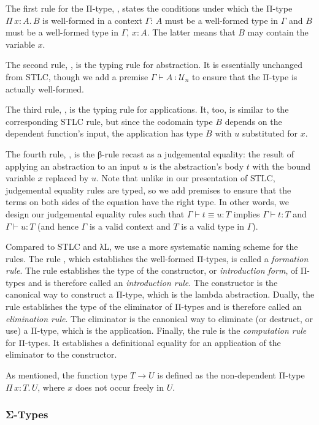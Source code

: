 \documentclass{scrartcl}
\theoremstyle{definition}
\newcommand{\PiT}[2]{Π\,#1.\, #2}
\newcommand{\Univ}{\mathcal{U}}
\newcommand{\lbl}[1]{\RightTirNameStyle{#1}}
\begin{document}
The first rule for the Π-type, \lbl{Π-Form}, states the conditions under which the Π-type $\PiT{x : A}{B}$ is well-formed in a context $Γ$: $A$ must be a well-formed type in $Γ$ and $B$ must be a well-formed type in $Γ,\, x : A$.
The latter means that $B$ may contain the variable $x$.

The second rule, \lbl{Π-Intro}, is the typing rule for abstraction.
It is essentially unchanged from STLC, though we add a premise $Γ ⊢ A ∶ \Univ_{n}$ to ensure that the Π-type is actually well-formed.

The third rule, \lbl{Π-Elim}, is the typing rule for applications.
It, too, is similar to the corresponding STLC rule, but since the codomain type $B$ depends on the dependent function's input, the application has type $B$ with $u$ substituted for $x$.

The fourth rule, \lbl{Π-Comp}, is the β-rule recast as a judgemental equality: the result of applying an abstraction to an input $u$ is the abstraction's body $t$ with the bound variable $x$ replaced by $u$.
Note that unlike in our presentation of STLC, judgemental equality rules are typed, so we add premises to ensure that the terms on both sides of the equation have the right type.
In other words, we design our judgemental equality rules such that $Γ ⊢ t ≡ u : T$ implies $Γ ⊢ t : T$ and $Γ ⊢ u : T$ (and hence $Γ$ is a valid context and $T$ is a valid type in $Γ$).

Compared to STLC and λL, we use a more systematic naming scheme for the rules.
The rule \lbl{Π-Form}, which establishes the well-formed Π-types, is called a \emph{formation rule}.
The rule \lbl{Π-Intro} establishes the type of the constructor, or \emph{introduction form}, of Π-types and is therefore called an \emph{introduction rule}.
The constructor is the canonical way to construct a Π-type, which is the lambda abstraction.
Dually, the rule \lbl{Π-Elim} establishes the type of the eliminator of Π-types and is therefore called an \emph{elimination rule}.
The eliminator is the canonical way to eliminate (or destruct, or use) a Π-type, which is the application.
Finally, the rule \lbl{Π-Comp} is the \emph{computation rule} for Π-types.
It establishes a definitional equality for an application of the eliminator to the constructor.

As mentioned, the function type $T → U$ is defined as the non-dependent Π-type $\PiT{x : T}{U}$, where $x$ does not occur freely in $U$.

\subsubsection{Σ-Types}
\end{document}
